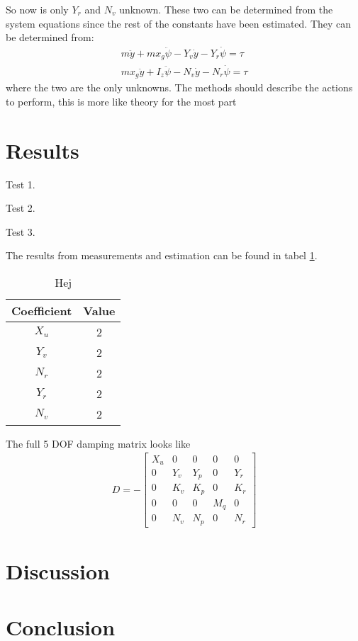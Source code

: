 So now is only $Y_r$ and $N_v$ unknown. These two can be determined from the system equations since the rest of the constants have been estimated. They can be determined from:
\begin{align}
m \ddot y + mx_g\ddot\psi - Y_v \dot y - Y_r \dot \psi = \tau\\
mx_g \ddot y + I_z\ddot \psi - N_v \dot y - N_r \dot \psi = \tau
\end{align}
where the two are the only unknowns.
The methods should describe the actions to perform, this is more like
theory for the most part

\section{Results}
Test 1.




Test 2.




Test 3.






The results from measurements and estimation can be found in tabel \ref{tab:dmatrix}.

\begin{table}[htbp]
\centering
\begin{tabular}{ c | c }
  Coefficient & Value \\
  \hline
  $X_u$ & 2 \\
  $Y_v$ & 2 \\
  $N_r$ & 2 \\
  $Y_r$ & 2 \\
  $N_v$ & 2
\end{tabular}
\caption{Hej}
\label{tab:dmatrix}
\end{table}

The full 5 \ac{DOF} damping matrix looks like
\begin{align}
D =-
\begin{bmatrix}
X_u & 0 & 0 & 0 & 0\\
0 & Y_v & Y_p & 0 & Y_r\\
0 & K_v & K_p & 0 & K_r\\
0 & 0 & 0 & M_q & 0\\
0 & N_v & N_p & 0 & N_r
\end{bmatrix}
\end{align}


\section{Discussion}


\section{Conclusion}

